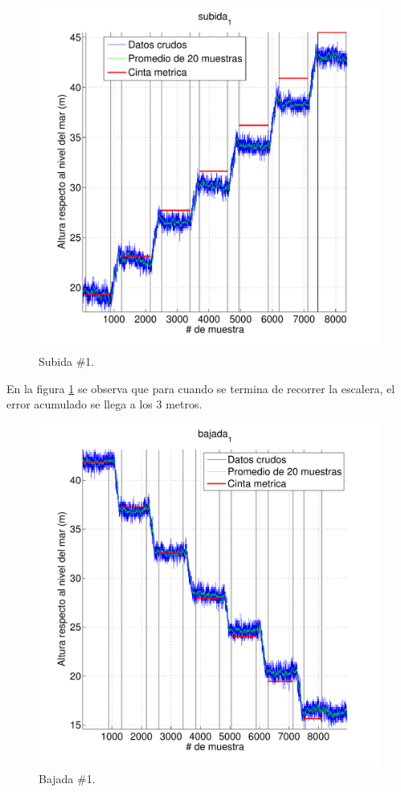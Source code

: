 \documentclass[spanish,12pt,a4paper,titlepage]{report}
\begin{document}
\vspace{-12pt}
\begin{figure}[h!]
\centering
  \includegraphics[width=.90\textwidth]{./pics/metros-s1.pdf}
\vspace{-15pt}
  \caption{Subida \#1.}
  \label{fig:metros-s1.pdf}
\end{figure}
\vspace{-15pt}

En la figura \ref{fig:metros-s1.pdf} se observa que para cuando se termina de recorrer la escalera, el error acumulado se llega a los 3 metros.

\newpage
\vspace{-40pt}
\begin{figure}[h!]
\centering
  \includegraphics[width=.95\textwidth]{./pics/metros-b1.pdf}
\vspace{-25pt}
  \caption{Bajada \#1.}
  \label{fig:metros-b1.pdf}
\end{figure}
\end{document}
